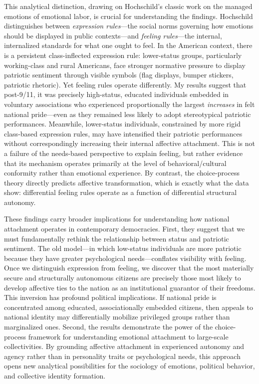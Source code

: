 \documentclass[12pt,letterpaper]{article}
\begin{document}
This analytical distinction, drawing on Hochschild's \citeyearpar{hochschild1979emotion-624} classic work on the managed emotions of emotional labor, is crucial for understanding the findings. Hochschild distinguishes between \textit{expression rules}---the social norms governing how emotions should be displayed in public contexts---and \textit{feeling rules}---the internal, internalized standards for what one ought to feel. In the American context, there is a persistent class-inflected expression rule: lower-status groups, particularly working-class and rural Americans, face stronger normative pressure to display patriotic sentiment through visible symbols (flag displays, bumper stickers, patriotic rhetoric). Yet feeling rules operate differently. My results suggest that post-9/11, it was precisely high-status, educated individuals embedded in voluntary associations who experienced proportionally the largest \textit{increases} in felt national pride---even as they remained less likely to adopt stereotypical patriotic performances. Meanwhile, lower-status individuals, constrained by more rigid class-based expression rules, may have intensified their patriotic performances without correspondingly increasing their internal affective attachment. This is not a failure of the needs-based perspective to explain feeling, but rather evidence that its mechanism operates primarily at the level of behavioral/cultural conformity rather than emotional experience. By contrast, the choice-process theory directly predicts affective transformation, which is exactly what the data show: differential feeling rules operate as a function of differential structural autonomy.

These findings carry broader implications for understanding how national attachment operates in contemporary democracies. First, they suggest that we must fundamentally rethink the relationship between status and patriotic sentiment. The old model---in which low-status individuals are more patriotic because they have greater psychological needs---conflates visibility with feeling. Once we distinguish expression from feeling, we discover that the most materially secure and structurally autonomous citizens are precisely those most likely to develop affective ties to the nation as an institutional guarantor of their freedoms. This inversion has profound political implications. If national pride is concentrated among educated, associationally embedded citizens, then appeals to national identity may differentially mobilize privileged groups rather than marginalized ones. Second, the results demonstrate the power of the choice-process framework for understanding emotional attachment to large-scale collectivities. By grounding affective attachment in experienced autonomy and agency rather than in personality traits or psychological needs, this approach opens new analytical possibilities for the sociology of emotions, political behavior, and collective identity formation.
\end{document}
